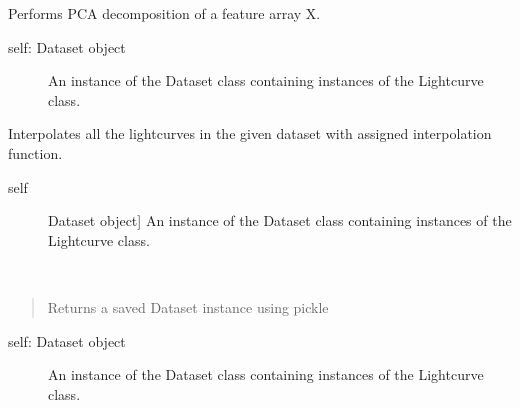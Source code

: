 \documentclass[a4paper,10pt,english]{sphinxmanual}
\begin{document}
\begin{fulllineitems}
\begin{fulllineitems}
\begin{description}
\end{description}

\end{fulllineitems}


\begin{fulllineitems}
\label{\detokenize{api:malt.Dataset.get_pca}}
Performs PCA decomposition of a feature array X.
\begin{description}
\item[{self: Dataset object}] \leavevmode
An instance of the Dataset class containing instances of the
Lightcurve class.

\end{description}

\end{fulllineitems}


\begin{fulllineitems}
\label{\detokenize{api:malt.Dataset.interpolate}}
Interpolates all the lightcurves in the given dataset with
assigned interpolation function.
\begin{description}
\item[{self}] \leavevmode{[}Dataset object{]}
An instance of the Dataset class containing instances of the
Lightcurve class.

\end{description}

\end{fulllineitems}


\begin{fulllineitems}
\label{\detokenize{api:malt.Dataset.load_from_save}}~\begin{quote}

Returns a saved Dataset instance using pickle
\end{quote}
\begin{description}
\item[{self: Dataset object}] \leavevmode
An instance of the Dataset class containing instances of the
Lightcurve class.


\end{description}
\end{fulllineitems}
\end{fulllineitems}
\end{document}
